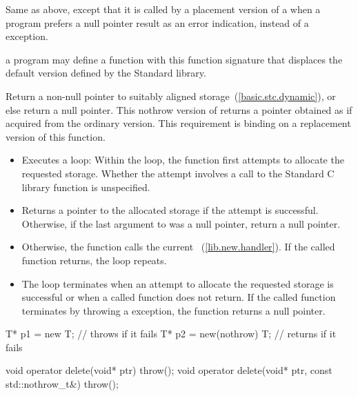\begin{itemdescr}
\pnum
\effects
Same as above, except that it is called by a placement version of a
when a \Cpp program prefers a null pointer result as an error indication,
instead of a
exception.

\pnum
\replaceable
a \Cpp program may define a function with this function signature
that displaces the default version defined by the
\Cpp Standard library.

\pnum
\required
Return a non-null pointer to suitably aligned storage~(\ref{basic.stc.dynamic}),
or else return a null pointer.
This nothrow version of
returns a pointer obtained as if acquired from the ordinary version.
This requirement is binding on a replacement version of this function.

\pnum
{}

\begin{itemize}
\item
Executes a loop:
Within the loop, the function first attempts to allocate the requested storage.
Whether the attempt involves a call to the Standard C library function
is unspecified.
%
\item
Returns a pointer to the allocated storage if the attempt is successful.
Otherwise, if the last argument to
was a null pointer, return a null pointer.
\item
Otherwise, the function calls the current
~(\ref{lib.new.handler}).
If the called function returns, the loop repeats.
\item
The loop terminates when an attempt to allocate the requested storage is
successful or when a called
function does not return.
If the called  function terminates by throwing a
exception, the function returns a null pointer.
\end{itemize}

\pnum
\enterexample
\begin{codeblock}
T* p1 = new T;                  // throws  if it fails
T* p2 = new(nothrow) T;         // returns  if it fails
\end{codeblock}
\exitexampleb
\end{itemdescr}

%
\begin{itemdecl}
void operator delete(void* ptr) throw();
void operator delete(void* ptr, const std::nothrow_t&) throw();
\end{itemdecl}

